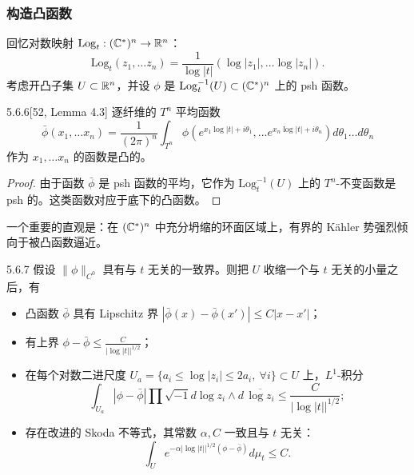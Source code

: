 \subsubsection{构造凸函数}
回忆对数映射 $\mathrm{Log}_t:(\mathbb{C}^*)^n\to\mathbb{R}^n$：
\[
\mathrm{Log}_t(z_1,\dots z_n)=\frac{1}{\log|t|}(\log|z_1|,\dots\log|z_n|).
\]
考虑开凸子集 $U\subset\mathbb{R}^n$，并设 $\phi$ 是 $\mathrm{Log}_t^{-1}(U)\subset(\mathbb{C}^*)^n$ 上的 psh 函数。

\begin{lemma}{5.6.6}[52, Lemma 4.3]
逐纤维的 $T^n$ 平均函数
\[
\bar\phi(x_1,\dots x_n)=\frac{1}{(2\pi)^n}\int_{T^n}\phi(e^{x_1\log|t|+i\theta_1},\dots e^{x_n\log|t|+i\theta_n})d\theta_1\dots d\theta_n
\]
作为 $x_1,\dots x_n$ 的函数是凸的。
\end{lemma}


\begin{proof}
由于函数 $\bar\phi$ 是 psh 函数的平均，它作为 $\mathrm{Log}_t^{-1}(U)$ 上的 $T^n$-不变函数是 psh 的。这类函数对应于底下的凸函数。\proofend
\end{proof}

一个重要的直观是：在 $(\mathbb{C}^*)^n$ 中充分坍缩的环面区域上，有界的 Kähler 势强烈倾向于被凸函数逼近。

\begin{proposition}{5.6.7}
假设 $\|\phi\|_{C^0}$ 具有与 $t$ 无关的一致界。则把 $U$ 收缩一个与 $t$ 无关的小量之后，有
\begin{itemize}
\item 凸函数 $\bar\phi$ 具有 Lipschitz 界 $|\bar\phi(x)-\bar\phi(x')|\le C|x-x'|$；
\item 有上界 $\phi-\bar\phi\le\frac{C}{|\log|t||^{1/2}}$；
\item 在每个对数二进尺度 $U_a=\{a_i\le\log|z_i|\le 2a_i,\ \forall i\}\subset U$ 上，$L^1$-积分
\[
\int_{U_a}|\phi-\bar\phi|\prod\sqrt{-1}d\log z_i\wedge d\,\overline{\log z_i}\le\frac{C}{|\log|t||^{1/2}};
\]
\item 存在改进的 Skoda 不等式，其常数 $\alpha,C$ 一致且与 $t$ 无关：
\[
\int_U e^{-\alpha|\log|t||^{1/2}(\phi-\bar\phi)}d\mu_t\le C.
\]
\end{itemize}
\end{proposition}

